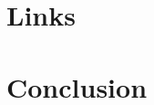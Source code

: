 \documentclass[10pt, a4paper]{article}
\begin{document}
\section{Links}

\section{Conclusion}



\end{document}
